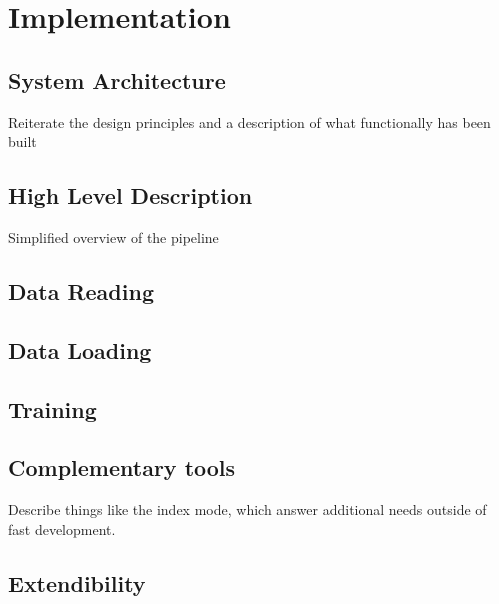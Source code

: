 \chapter{Implementation}

\section{System Architecture}

Reiterate the design principles and a description of what functionally has been built

\section{High Level Description}

Simplified overview of the pipeline

\section{Data Reading}

\section{Data Loading}

\section{Training}

\section{Complementary tools}

Describe things like the index mode, which answer additional needs outside of fast development.

\section{Extendibility}